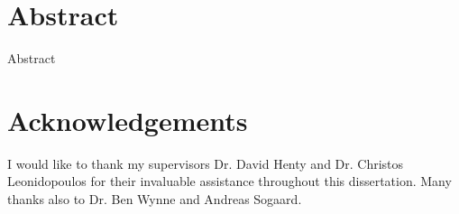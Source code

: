 \chapter*{Abstract}

\begin{comment}
\thispagestyle{plain}
\begin{center}
    \Large
    \textbf{Performance analysis of particle jet software for the ATLAS experiment}
    
    \vspace{0.4cm}
    \large
    
    
    \vspace{0.4cm}
    \textbf{Neofytos Themistokleous}
    
    \vspace{0.9cm}
    \textbf{Abstract}
\end{center}
\end{comment}
Abstract

\chapter*{Acknowledgements}
I would like to thank my supervisors Dr. David Henty  and Dr. Christos Leonidopoulos for their
invaluable assistance throughout this dissertation. Many thanks also to Dr. Ben Wynne and Andreas Sogaard.